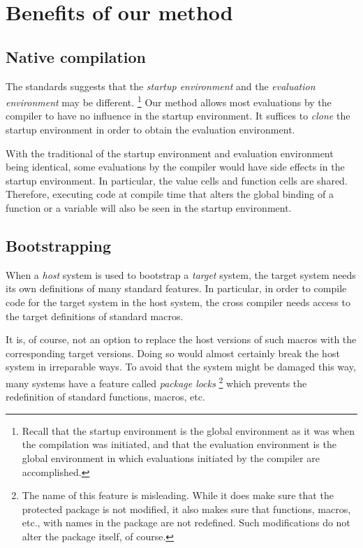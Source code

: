 \section{Benefits of our method}
 
\subsection{Native compilation}

The \commonlisp{} standards suggests that the \emph{startup
  environment} and the \emph{evaluation environment} may be
different.%
\footnote{Recall that the startup environment is the global
environment as it was when the compilation was initiated, and that the
evaluation environment is the global environment in which evaluations
initiated by the compiler are accomplished.}
Our method allows most evaluations by the compiler to have no
influence in the startup environment.  It suffices to \emph{clone} the
startup environment in order to obtain the evaluation environment.

With the traditional of the startup environment and evaluation
environment being identical, some evaluations by the compiler would
have side effects in the startup environment.  In particular, the
value cells and function cells are shared.  Therefore, executing code
at compile time that alters the global binding of a function or a
variable will also be seen in the startup environment.

\subsection{Bootstrapping}

When a \emph{host} \commonlisp{} system is used to bootstrap a
\emph{target} \commonlisp{} system, the target system needs its own
definitions of many standard \commonlisp{} features.  In particular,
in order to compile code for the target system in the host system, the
cross compiler needs access to the target definitions of standard
\commonlisp{} macros.

It is, of course, not an option to replace the host versions of such
macros with the corresponding target versions.  Doing so would almost
certainly break the host system in irreparable ways.  To avoid that
the system might be damaged this way,
many \commonlisp{} systems have a feature called \emph{package locks}%
\footnote{The name of this feature is misleading.  While it does make
  sure that the protected package is not modified, it also makes sure
  that functions, macros, etc., with names in the package are not
  redefined.  Such modifications do not alter the package itself, of
  course.}
which prevents the redefinition of standard \commonlisp{} functions,
macros, etc.

